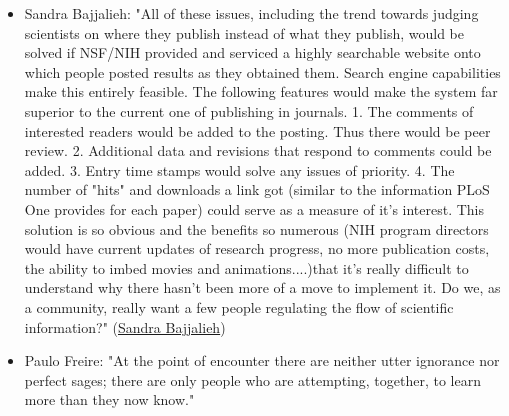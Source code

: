 \documentclass[final,authoryear,3p]{elsarticle-open-drafting}
\begin{document}
\begin{itemize}
	\item  Sandra Bajjalieh: "All of these issues, including the trend towards judging scientists on where they publish instead of what they publish, would be solved if NSF/NIH provided and serviced a highly searchable website onto which people posted results as they obtained them. Search engine capabilities make this entirely feasible. The following features would make the system far superior to the current one of publishing in journals. 1. The comments of interested readers would be added to the posting. Thus there would be peer review. 2. Additional data and revisions that respond to comments could be added. 3. Entry time stamps would solve any issues of priority. 4. The number of "hits" and downloads a link got (similar to the information PLoS One provides for each paper) could serve as a measure of it's interest. This solution is so obvious and the benefits so numerous (NIH program directors would have current updates of research progress, no more publication costs, the ability to imbed movies and animations....)that it's really difficult to understand why there hasn't been more of a move to implement it. Do we, as a community, really want a few people regulating the flow of scientific information?" (\href{http://www.nature.com/news/2011/110427/full/472391a.html}{Sandra Bajjalieh})
	
	\item  Paulo Freire: "At the point of encounter there are neither utter ignorance nor perfect sages; there are only people who are attempting, together, to learn more than they now know." 


\end{itemize}
\end{document}
